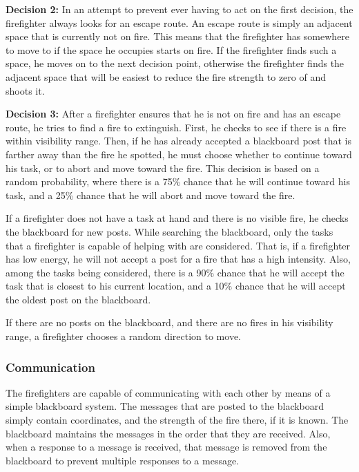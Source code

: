 \documentclass{article}
\begin{document}
\begin{description}
\begin{description}
    \end{description}

  \item \textbf{Decision 2:}
    In an attempt to prevent ever having to act on the first decision, the
    firefighter always looks for an escape route. An escape route is simply an
    adjacent space that is currently not on fire. This means that the firefighter
    has somewhere to move to if the space he occupies starts on fire. If the
    firefighter finds such a space, he moves on to the next decision point,
    otherwise the firefighter finds the adjacent space that will be easiest
    to reduce the fire strength to zero of and shoots it.

  \item \textbf{Decision 3:}
    After a firefighter ensures that he is not on fire and has an escape route,
    he tries to find a fire to extinguish. First, he checks to see if there is
    a fire within visibility range. Then, if he has already accepted a blackboard
    post that is farther away than the fire he spotted, he must choose whether
    to continue toward his task, or to abort and move toward the fire.  This
    decision is based on a random probability, where there is a 75\% chance that
    he will continue toward his task, and a 25\% chance that he will abort
    and move toward the fire.

    If a firefighter does not have a task at hand and there is no visible fire,
    he checks the blackboard for new posts.  While searching the blackboard,
    only the tasks that a firefighter is capable of helping with are considered.
    That is, if a firefighter has low energy, he will not accept a post for a
    fire that has a high intensity.  Also, among the tasks being considered,
    there is a 90\% chance that he will accept the task that is closest to his
    current location, and a 10\% chance that he will accept the oldest post on
    the blackboard.

    If there are no posts on the blackboard, and there are no fires in his
    visibility range, a firefighter chooses a random direction to move.

  \end{description}

  \subsubsection*{Communication}
  The firefighters are capable of communicating with each other by means of a
  simple blackboard system.  The messages that are posted to the blackboard
  simply contain coordinates, and the strength of the fire there, if it is
  known.  The blackboard maintains the messages in the order that they are
  received.  Also, when a response to a message is received, that message is
  removed from the blackboard to prevent multiple responses to a message.
\end{document}
